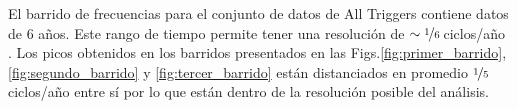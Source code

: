 \documentclass[12pt, doublespace, oneside]{article}
\begin{document}
    El barrido de frecuencias para el conjunto de datos de All Triggers contiene datos de 6 años. Este rango de tiempo  permite tener una resolución de $\sim\nicefrac{1}{6}  \,$ciclos/año \cite{resolucion_barrido}. Los picos obtenidos en los barridos presentados en las Figs.\ref{fig:primer_barrido}, \ref{fig:segundo_barrido} y \ref{fig:tercer_barrido} están distanciados en promedio $\nicefrac{1}{5}\,$ciclos/año entre sí por lo que están dentro de la resolución posible del análisis. 


    

\end{document}

